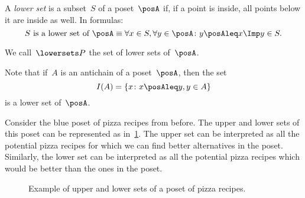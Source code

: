 \begin{definition}
  \label{def:lowerset}
  A \emph{lower set} is a subset~$S$ of a poset~$\posA$ if, if a point is inside, all points below it are inside as well. In formulas:
  \begin{equation}
    \text{$S$ is a lower set of $\posA$} \equiv \forall x\in S, \forall y\in \posA \colon y\posAleq x \Imp y\in S.
  \end{equation}
\end{definition}
\begin{remark}
  We call~$\lowersets P$ the set of lower sets of~$\posA$.
\end{remark}

\begin{remark}
  Note that if~$A$ is an antichain of a poset~$\posA$, then the set
  \begin{equation}
    I(A)=\{x\colon x\posAleq y, y\in A\}
  \end{equation}
  is a lower set of~$\posA$.
\end{remark}

Consider the blue poset of pizza recipes from before. The upper and lower sets of this poset can be represented as in~\cref{fig:upperset}. The upper set can be interpreted as all the potential pizza recipes for which we can find better alternatives in the poset. Similarly, the lower set can be interpreted as all the potential pizza recipes which would be better than the ones in the poset.

\begin{figure}[h!]
  \begin{center}
  \end{center}
  \caption{Example of upper and lower sets of a poset of pizza recipes.}
   \label{fig:upperset}
\end{figure}

%



